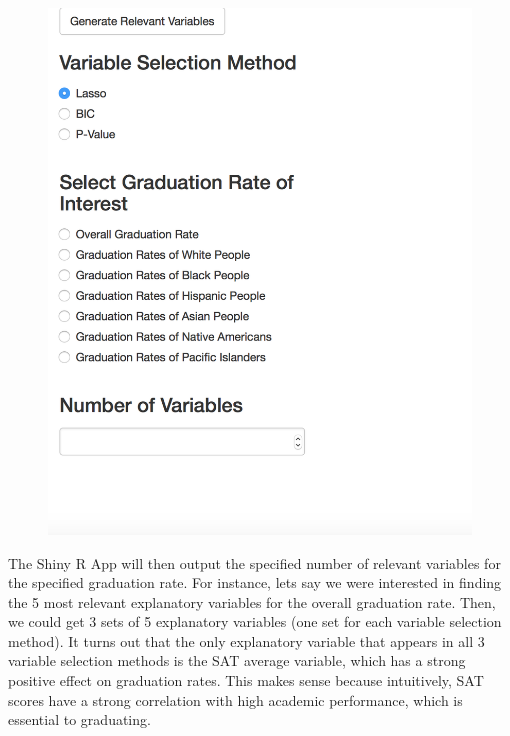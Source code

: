 \documentclass{article}
\begin{document}
\begin{figure}[!htb]
\includegraphics{../images/screenshot.png}
\end{figure}


The Shiny R App will then output the specified number of relevant variables for the specified graduation rate. For instance, lets say we were interested in finding the 5 most relevant explanatory variables for the overall graduation rate. Then, we could get 3 sets of 5 explanatory variables (one set for each variable selection method). It turns out that the only explanatory variable that appears in all 3 variable selection methods is the SAT average variable, which has a strong positive effect on graduation rates. This makes sense because intuitively, SAT scores have a strong correlation with high academic performance, which is essential to graduating. 
\end{document}

